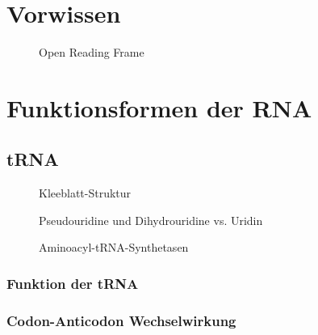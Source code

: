 
\section*{Vorwissen}

\begin{figure}
    \caption{Open Reading Frame}\label{fig:figure14}
\end{figure}

\section{Funktionsformen der RNA}\label{sec:funktionsformen-der-rna}

\subsection{tRNA}\label{subsec:trna}
\begin{figure}
    \caption{Kleeblatt-Struktur}\label{fig:figure13}
\end{figure}


\begin{figure}
    \caption{Pseudouridine und Dihydrouridine vs. Uridin}\label{fig:figure12}
\end{figure}


\begin{figure}
    \caption{Aminoacyl-tRNA-Synthetasen}\label{fig:figure11}
\end{figure}


\subsubsection{Funktion der tRNA}

\subsubsection{Codon-Anticodon Wechselwirkung}

